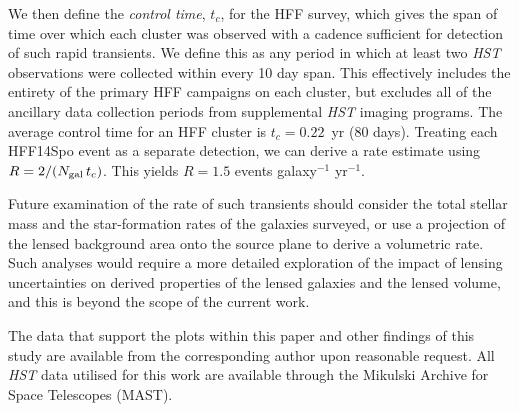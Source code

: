\documentclass{article}
\def\HST{{\it HST}\xspace}
\def\spock{HFF14Spo\xspace}
\begin{document}
We then define the {\it control time}, $t_{c}$, for the HFF survey,
which gives the span of time over which each cluster was observed with
a cadence sufficient for detection of such rapid transients.  We
define this as any period in which at least two \HST observations were
collected within every 10 day span. This effectively includes the
entirety of the primary HFF campaigns on each cluster, but excludes
all of the ancillary data collection periods from supplemental \HST
imaging programs. The average control time for an HFF cluster is
$t_{c} = 0.22$~yr (80 days).  Treating each \spock event as a
separate detection, we can derive a rate estimate using $R = 2 /
(N_{\rm gal}\,t_c)$.  This yields $R=1.5$ events galaxy$^{-1}$
yr$^{-1}$.   

Future examination of the rate of such transients should consider the
total stellar mass and the star-formation rates of the galaxies
surveyed, or use a projection of the lensed background area onto the
source plane to derive a volumetric rate.  Such analyses would require
a more detailed exploration of the impact of lensing uncertainties on
derived properties of the lensed galaxies and the lensed volume, and
this is beyond the scope of the current work.



The data that support the plots within this paper and other findings
of this study are available from the corresponding author upon
reasonable request.  All \HST data utilised for this work are
available through the Mikulski Archive for Space Telescopes (MAST).


\clearpage
\end{document}
